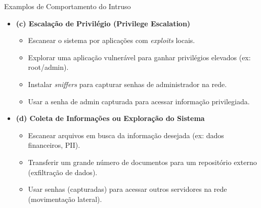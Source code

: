 \begin{frame}{Examplos de Comportamento do Intruso}
    \begin{itemize}
        \item \textbf{(c) Escalação de Privilégio (Privilege Escalation)}
              \begin{itemize}
                  \item Escanear o sistema por aplicações com \textit{exploits} locais.
                  \item Explorar uma aplicação vulnerável para ganhar privilégios elevados (ex: root/admin).
                  \item Instalar \textit{sniffers} para capturar senhas de administrador na rede.
                  \item Usar a senha de admin capturada para acessar informação privilegiada.
              \end{itemize}

        \item \textbf{(d) Coleta de Informações ou Exploração do Sistema}
              \begin{itemize}
                  \item Escanear arquivos em busca da informação desejada (ex: dados financeiros, PII).
                  \item Transferir um grande número de documentos para um repositório externo (exfiltração de dados).
                  \item Usar senhas (capturadas) para acessar outros servidores na rede (movimentação lateral).
              \end{itemize}
    \end{itemize}
\end{frame}
